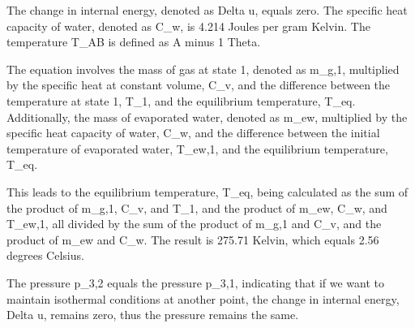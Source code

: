 The change in internal energy, denoted as Delta u, equals zero. The specific heat capacity of water, denoted as C_w, is 4.214 Joules per gram Kelvin. The temperature T_AB is defined as A minus 1 Theta.

The equation involves the mass of gas at state 1, denoted as m_g,1, multiplied by the specific heat at constant volume, C_v, and the difference between the temperature at state 1, T_1, and the equilibrium temperature, T_eq. Additionally, the mass of evaporated water, denoted as m_ew, multiplied by the specific heat capacity of water, C_w, and the difference between the initial temperature of evaporated water, T_ew,1, and the equilibrium temperature, T_eq.

This leads to the equilibrium temperature, T_eq, being calculated as the sum of the product of m_g,1, C_v, and T_1, and the product of m_ew, C_w, and T_ew,1, all divided by the sum of the product of m_g,1 and C_v, and the product of m_ew and C_w. The result is 275.71 Kelvin, which equals 2.56 degrees Celsius.

The pressure p_3,2 equals the pressure p_3,1, indicating that if we want to maintain isothermal conditions at another point, the change in internal energy, Delta u, remains zero, thus the pressure remains the same.
